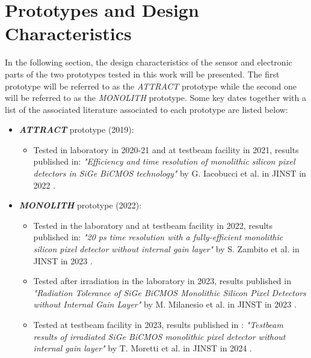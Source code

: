 	\section{Prototypes and Design Characteristics}
	In the following section, the design characteristics of the sensor and electronic parts of the two prototypes tested in this work will be presented. The first prototype will be referred to as the \textit{ATTRACT} prototype while the second one will be referred to as the \textit{MONOLITH} prototype. Some key dates together with a list of the associated literature associated to each prototype are listed below: 
	\begin{itemize}
		\item \textbf{\textit{ATTRACT}} prototype (2019): 
		\begin{itemize}
			\item Tested in laboratory in 2020-21 and at testbeam facility in 2021, results published in: \textit{"Efficiency and time resolution of monolithic silicon pixel detectors in SiGe BiCMOS technology"} by G. Iacobucci et al. in JINST in 2022 \cite{ATTRACT_proto1_50ps}. 
		\end{itemize}
		\item \textbf{\textit{MONOLITH}} prototype (2022):
		\begin{itemize}
			\item Tested in the laboratory and at testbeam facility in 2022, results published in: \textit{"20 ps time resolution with a fully-efficient monolithic silicon pixel detector without internal gain layer"} by S. Zambito et al. in JINST in 2023 \cite{MONOLITH_proto2_20ps}.
			\item Tested after irradiation in the laboratory in 2023, results published in \textit{"Radiation Tolerance of SiGe BiCMOS Monolithic Silicon Pixel Detectors without Internal Gain Layer"} by M. Milanesio et al. in JINST in 2023 \cite{MONOLITH_RadHard_lab}.
			\item Tested at testbeam facility in 2023, results published in : \textit{"Testbeam results of irradiated SiGe BiCMOS monolithic pixel detector without internal gain layer"} by T. Moretti et al. in JINST in 2024 \cite{MONOLITH_RadHard_testbeam}.
		\end{itemize} 
	\end{itemize}

